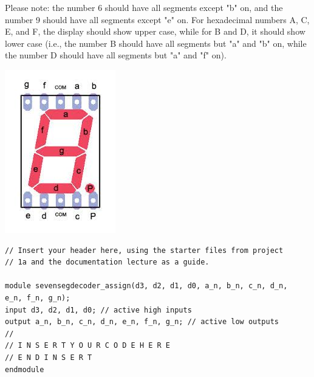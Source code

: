 \documentclass[12pt,letterpaper,titlepage]{article}
\begin{document}
\begin{raggedright}
Please note: the number 6 should have all segments except "b" on, and the number 9 should have all segments except "e" on. For hexadecimal numbers A, C, E, and F, the display should show upper case, while for B and D, it should show lower case (i.e., the number B should have all segments but "a" and "b" on, while the number D should have all segments but "a" and "f" on).
\begin{center}
\includegraphics[width=\textwidth, height=9\baselineskip, keepaspectratio=true]{hw3q2}
\end{center}

\begin{lstlisting}
// Insert your header here, using the starter files from project
// 1a and the documentation lecture as a guide.

module sevensegdecoder_assign(d3, d2, d1, d0, a_n, b_n, c_n, d_n, 
e_n, f_n, g_n);
input d3, d2, d1, d0; // active high inputs
output a_n, b_n, c_n, d_n, e_n, f_n, g_n; // active low outputs
//
// I N S E R T Y O U R C O D E H E R E
// E N D I N S E R T
endmodule
\end{lstlisting}


\end{raggedright}
\end{document}
